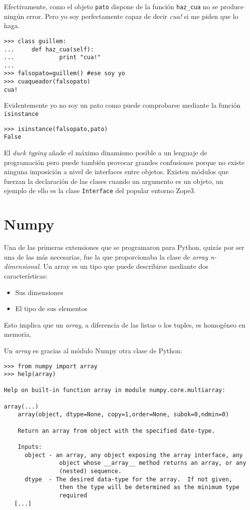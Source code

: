 \documentclass[a4paper,10pt]{article}
\begin{document}
Efectivamente, como el objeto \texttt{pato} dispone de la función
\texttt{haz\_cua} no se produce ningún error.  Pero yo soy
perfectamente capaz de decir \emph{cua!} si me piden que lo haga.

\begin{lstlisting}
>>> class guillem:
...     def haz_cua(self):
...             print "cua!"
...
>>> falsopato=guillem() #ese soy yo
>>> cuaqueador(falsopato)
cua!
\end{lstlisting}

Evidentemente yo no soy un pato como puede comprobarse mediante la
función \texttt{isinstance}

\begin{lstlisting}
>>> isinstance(falsopato,pato)
False
\end{lstlisting}

El \emph{duck typing} añade el máximo dinamismo posible a un lenguaje
de programación pero puede también provocar grandes confusiones porque
no existe ninguna imposición a nivel de interfaces entre objetos.
Existen módulos que fuerzan la declaración de las clases cuando un
argumento es un objeto, un ejemplo de ello es la clase
\texttt{Interface} del popular entorno Zope3.

\section{Numpy}

Una de las primeras extensiones que se programaron para Python, quizás
por ser una de las más necesarias, fue la que proporcionaba la clase
de \emph{array n-dimensional}.  Un array es un tipo que puede
describirse mediante dos características:

\begin{itemize}
\item Sus dimensiones
\item El tipo de sus elementos
\end{itemize}

Esto implica que un \emph{array}, a diferencia de las listas o los
tuples, es homogéneo en memoria.

Un \emph{array} es gracias al módulo Numpy otra clase de Python:

\begin{lstlisting}
>>> from numpy import array
>>> help(array)

Help on built-in function array in module numpy.core.multiarray:

array(...)
    array(object, dtype=None, copy=1,order=None, subok=0,ndmin=0)

    Return an array from object with the specified date-type.

    Inputs:
      object - an array, any object exposing the array interface, any
                object whose __array__ method returns an array, or any
                (nested) sequence.
      dtype  - The desired data-type for the array.  If not given,
                then the type will be determined as the minimum type
                required
   [...]
\end{lstlisting}
\end{document}

